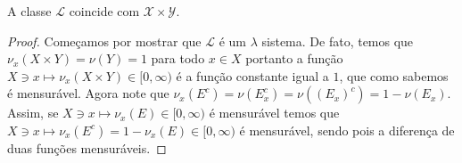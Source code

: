 \begin{proposicao}
A classe $\mathscr{L}$ coincide com $\mathscr{X}\times \mathscr{Y}$.
\end{proposicao}
\begin{proof}
Começamos por mostrar que $\mathscr{L}$ é um $\lambda$ sistema. De fato, temos que
$\nu_x(X\times Y)=\nu(Y)=1$ para todo $x\in X$ portanto
 a função $X\ni x\mapsto \nu_x(X\times Y)\in [0,\infty)$ é a função constante
igual a $1$, que como sabemos é mensurável.
  Agora note que $\nu_x(E^c)=\nu(E^c_x)=\nu((E_x)^c)=1-\nu(E_x).$
 Assim, se $X\ni x\mapsto \nu_x(E)\in [0, \infty)$  é mensurável temos que 
 $X\ni x\mapsto \nu_x(E^c)=1-\nu_x(E)\in [0, \infty)$ é mensurável, sendo pois 
 a diferença de duas funções mensuráveis.
\end{proof}











